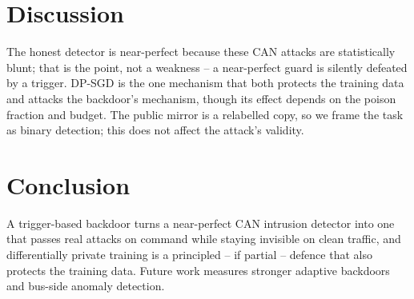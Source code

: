 \documentclass[conference]{IEEEtran}
\begin{document}
\section{Discussion}
The honest detector is near-perfect because these CAN attacks are statistically
blunt; that is the point, not a weakness -- a near-perfect guard is silently
defeated by a trigger. DP-SGD is the one mechanism that both protects the training
data and attacks the backdoor's mechanism, though its effect depends on the poison
fraction and budget. The public mirror is a relabelled copy, so we frame the task
as binary detection; this does not affect the attack's validity.

\section{Conclusion}
A trigger-based backdoor turns a near-perfect CAN intrusion detector into one that
passes real attacks on command while staying invisible on clean traffic, and
differentially private training is a principled -- if partial -- defence that also
protects the training data. Future work measures stronger adaptive backdoors and
bus-side anomaly detection.



\end{document}

